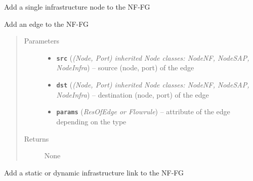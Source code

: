 \documentclass[letterpaper,10pt,english]{sphinxmanual}
\begin{document}
\begin{fulllineitems}
\begin{fulllineitems}
\label{util/nffg:escape.util.nffg.AbstractNFFG.add_infra}
Add a single infrastructure node to the NF-FG

\end{fulllineitems}


\begin{fulllineitems}
\label{util/nffg:escape.util.nffg.AbstractNFFG.add_edge}
Add an edge to the NF-FG
\begin{quote}\begin{description}
\item[{Parameters}] \leavevmode\begin{itemize}
\item {} 
\textbf{\texttt{src}} (\emph{(Node, Port) inherited Node classes: NodeNF, NodeSAP, NodeInfra}) -- source (node, port) of the edge

\item {} 
\textbf{\texttt{dst}} (\emph{(Node, Port) inherited Node classes: NodeNF, NodeSAP, NodeInfra}) -- destination (node, port) of the edge

\item {} 
\textbf{\texttt{params}} (\emph{ResOfEdge or Flowrule}) -- attribute of the edge depending on the type

\end{itemize}

\item[{Returns}] \leavevmode
None

\end{description}\end{quote}

\end{fulllineitems}


\begin{fulllineitems}
\label{util/nffg:escape.util.nffg.AbstractNFFG.add_link}
Add a static or dynamic infrastructure link to the NF-FG

\end{fulllineitems}



\end{fulllineitems}
\end{document}
